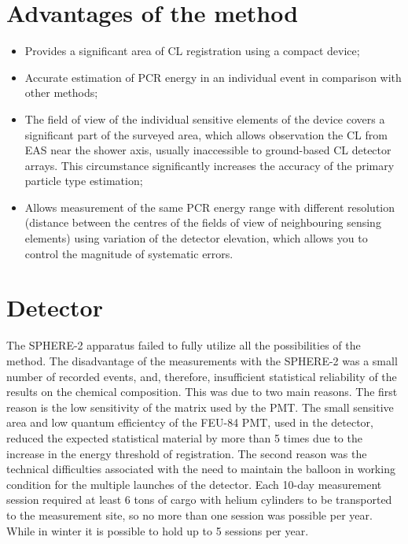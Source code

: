 \documentclass[a4paper,11pt]{article}
\begin{document}
\section{Advantages of the method}

\begin{itemize}
\item Provides a significant area of CL registration using a compact device;
\item Accurate estimation of PCR energy in an individual event in comparison with other methods;
\item The field of view of the individual sensitive elements of the device covers a significant part of the surveyed area, which allows observation the CL from EAS near the shower axis, usually inaccessible to ground-based CL detector arrays. This circumstance significantly increases the accuracy of the primary particle type estimation;
\item Allows measurement of the same PCR energy range with different resolution (distance between the centres of the fields of view of neighbouring sensing elements) using variation of the detector elevation, which allows you to control the magnitude of systematic errors.
\end{itemize}


\section{Detector}

The SPHERE-2 apparatus failed to fully utilize all the possibilities of the method. 
The disadvantage of the measurements with the SPHERE-2 was a small number of recorded events, and, therefore, insufficient statistical reliability of the results on the chemical composition.
This was due to two main reasons.
The first reason is the low sensitivity of the matrix used by the PMT.
The small sensitive area and low quantum efficientcy of the FEU-84 PMT, used in the detector, reduced the expected statistical material by more than 5 times due to the increase in the energy threshold of registration.
The second reason was the technical difficulties associated with the need to maintain the balloon in working condition for the multiple launches of the detector.
Each 10-day measurement session required at least 6 tons of cargo with helium cylinders to be transported to the measurement site, so no more than one session was possible per year.
While in winter it is possible to hold up to 5 sessions per year.
\end{document}
